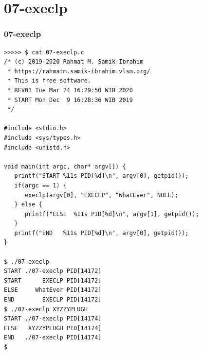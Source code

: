 \documentclass[xcolor=table, notheorems, hyperref={pdfpagelabels=false}]{beamer}
\begin{document}
\section{07-execlp}
\begin{frame}[fragile]
\frametitle{07-execlp}
\begin{lstlisting}[basicstyle=\ttfamily\tiny]
>>>>> $ cat 07-execlp.c 
/* (c) 2019-2020 Rahmat M. Samik-Ibrahim
 * https://rahmatm.samik-ibrahim.vlsm.org/
 * This is free software.
 * REV01 Tue Mar 24 16:29:50 WIB 2020
 * START Mon Dec  9 16:28:36 WIB 2019
 */

#include <stdio.h>
#include <sys/types.h>
#include <unistd.h>

void main(int argc, char* argv[]) {
   printf("START %11s PID[%d]\n", argv[0], getpid());
   if(argc == 1) {
      execlp(argv[0], "EXECLP", "WhatEver", NULL);
   } else {
      printf("ELSE  %11s PID[%d]\n", argv[1], getpid());
   }
   printf("END   %11s PID[%d]\n", argv[0], getpid());
}

$ ./07-execlp 
START ./07-execlp PID[14172]
START      EXECLP PID[14172]
ELSE     WhatEver PID[14172]
END        EXECLP PID[14172]
$ ./07-execlp XYZZYPLUGH
START ./07-execlp PID[14174]
ELSE   XYZZYPLUGH PID[14174]
END   ./07-execlp PID[14174]
$ 

\end{lstlisting}
\end{frame}

\end{document}
